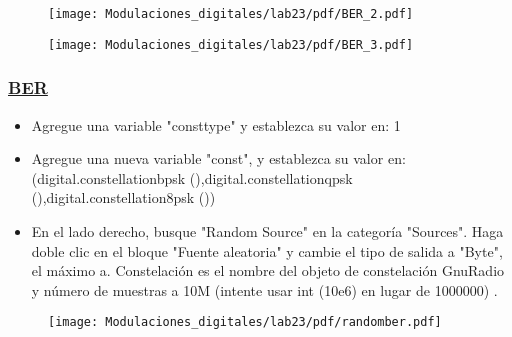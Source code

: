 
\begin{frame}
\begin{figure}[H]
\vspace{-3mm}
\centering
\texttt{[image: Modulaciones\_digitales/lab23/pdf/BER\_2.pdf]}
\end{figure}
\end{frame}


\begin{frame}
\begin{figure}[H]
\vspace{-3mm}
\centering
\texttt{[image: Modulaciones\_digitales/lab23/pdf/BER\_3.pdf]}
\end{figure}
\end{frame}


\begin{frame}

\frametitle{\underline{\textbf{BER}}}
\begin{itemize}
    \item {Agregue una variable "consttype" y establezca su valor en: 1}
    \item {Agregue una nueva variable "const", y establezca su valor en:(digital.constellationbpsk (),digital.constellationqpsk (),digital.constellation8psk ()) }
    \item {En el lado derecho, busque "Random Source" en la categoría "Sources". Haga doble clic en el bloque "Fuente aleatoria" y cambie el tipo de salida a "Byte", el máximo a. Constelación es el nombre del objeto de constelación GnuRadio y número de muestras a 10M (intente usar int (10e6) en lugar de 1000000) .}
\end{itemize}
\end{frame}


\begin{frame}
\begin{figure}[H]
\vspace{-3mm}
\centering
\texttt{[image: Modulaciones\_digitales/lab23/pdf/randomber.pdf]}
\end{figure}
\end{frame}

